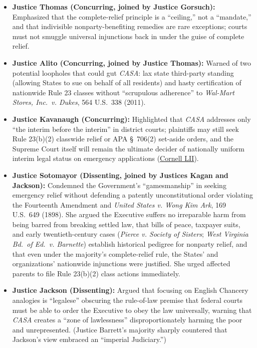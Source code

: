 \documentclass[12pt]{article}
\begin{document}
\begin{itemize}
  \item \textbf{Justice Thomas (Concurring, joined by Justice Gorsuch):} Emphasized that the complete-relief principle is a ``ceiling,'' not a ``mandate,'' and that indivisible nonparty-benefiting remedies are rare exceptions; courts must not smuggle universal injunctions back in under the guise of complete relief.
  \item \textbf{Justice Alito (Concurring, joined by Justice Thomas):} Warned of two potential loopholes that could gut \textit{CASA}: lax state third-party standing (allowing States to sue on behalf of all residents) and hasty certification of nationwide Rule 23 classes without ``scrupulous adherence'' to \textit{Wal-Mart Stores, Inc.\ v. Dukes}, 564 U.S.\ 338 (2011).
  \item \textbf{Justice Kavanaugh (Concurring):} Highlighted that \textit{CASA} addresses only ``the interim before the interim'' in district courts; plaintiffs may still seek Rule 23(b)(2) classwide relief or APA \S\ 706(2) set-aside orders, and the Supreme Court itself will remain the ultimate decider of nationally uniform interim legal status on emergency applications (\href{https://www.law.cornell.edu/supremecourt/text/24A884}{Cornell LII}).
  \item \textbf{Justice Sotomayor (Dissenting, joined by Justices Kagan and Jackson):} Condemned the Government's ``gamesmanship'' in seeking emergency relief without defending a patently unconstitutional order violating the Fourteenth Amendment and \textit{United States v. Wong Kim Ark}, 169 U.S.\ 649 (1898). She argued the Executive suffers no irreparable harm from being barred from breaking settled law, that bills of peace, taxpayer suits, and early twentieth-century cases (\textit{Pierce v. Society of Sisters}; \textit{West Virginia Bd.\ of Ed.\ v. Barnette}) establish historical pedigree for nonparty relief, and that even under the majority's complete-relief rule, the States' and organizations' nationwide injunctions were justified. She urged affected parents to file Rule 23(b)(2) class actions immediately.
  \item \textbf{Justice Jackson (Dissenting):} Argued that focusing on English Chancery analogies is ``legalese'' obscuring the rule-of-law premise that federal courts must be able to order the Executive to obey the law universally, warning that \textit{CASA} creates a ``zone of lawlessness'' disproportionately harming the poor and unrepresented. (Justice Barrett's majority sharply countered that Jackson's view embraced an ``imperial Judiciary.'')
\end{itemize}
\end{document}
